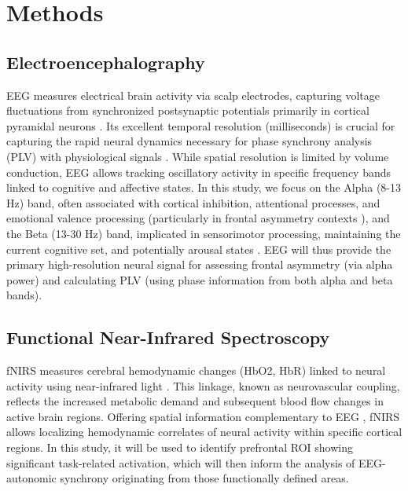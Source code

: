 \documentclass[12pt]{article} %
\begin{document}
\newpage
\section{Methods}

\subsection{Electroencephalography}
\gls{EEG} measures electrical brain activity via scalp electrodes, capturing voltage fluctuations from synchronized postsynaptic potentials primarily in cortical pyramidal neurons \parencite{sharmaEmergingTrendsEEG2024, chaddadElectroencephalographySignalProcessing2023}. Its excellent temporal resolution (milliseconds) is crucial for capturing the rapid neural dynamics necessary for phase synchrony analysis (\gls{PLV}) with physiological signals \parencite{cohenAnalyzingNeuralTime2014}. While spatial resolution is limited by volume conduction, \gls{EEG} allows tracking oscillatory activity in specific frequency bands linked to cognitive and affective states. In this study, we focus on the Alpha (8-13 Hz) band, often associated with cortical inhibition, attentional processes, and emotional valence processing (particularly in frontal asymmetry contexts \parencite{allenIssuesAssumptionsRoad2004, allenIssuesAssumptionsRoad2004}), and the Beta (13-30 Hz) band, implicated in sensorimotor processing, maintaining the current cognitive set, and potentially arousal states \parencite{klimeschEEGAlphaTheta1999, engelDynamicPredictionsOscillations2001}. \gls{EEG} will thus provide the primary high-resolution neural signal for assessing frontal asymmetry (via alpha power) and calculating \gls{PLV} (using phase information from both alpha and beta bands).

\subsection{Functional Near-Infrared Spectroscopy}
\gls{fNIRS} measures cerebral hemodynamic changes (\gls{HbO2}, \gls{HbR}) linked to neural activity using near-infrared light \parencite{scholkmannReviewContinuousWave2014, jobsisNoninvasiveInfraredMonitoring1977, obrigVisibleImagingHuman2003}. This linkage, known as neurovascular coupling, reflects the increased metabolic demand and subsequent blood flow changes in active brain regions. Offering spatial information complementary to \gls{EEG} \parencite{pintiCurrentStatusIssues2019}, \gls{fNIRS} allows localizing hemodynamic correlates of neural activity within specific cortical regions. In this study, it will be used to identify prefrontal \gls{ROI} showing significant task-related activation, which will then inform the analysis of \gls{EEG}-autonomic synchrony originating from those functionally defined areas.
\end{document}
